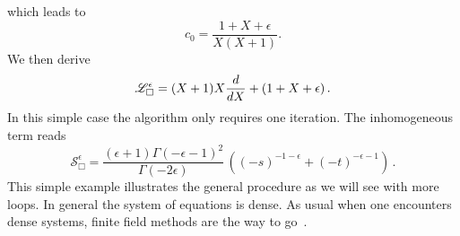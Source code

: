 \documentclass[a4paper,12pt]{article}
\numberwithin{equation}{section}
\numberwithin{figure}{section}
\begin{document}
which leads to 
%
\begin{equation}
	c_0= \frac{1+X+\epsilon }{X(X+1)}.
\end{equation}
We then derive
\begin{equation}\label{e:PFBox}
	\mathscr{L}_\Box^\epsilon= (X+1) X {d\over dX}+(1+X+\epsilon)  \,.
\end{equation}
In this simple case the algorithm only requires one iteration. 
The inhomogeneous term reads
\begin{equation}\label{e:SourceBox}
	\mathscr{S}_\Box^\epsilon=\frac{(\epsilon +1)\Gamma (-\epsilon -1)^2 }{\Gamma
		(-2 \epsilon )}  \, \left( (-s)^{-1-\epsilon }+(-t)^{-\epsilon -1}\right) \, .
\end{equation}
This simple example illustrates the general procedure as we will see with more loops. In general the system of equations is dense. As usual when one encounters dense  systems, finite field methods are the way to go~\cite{Peraro:2019svx}.
\end{document}
